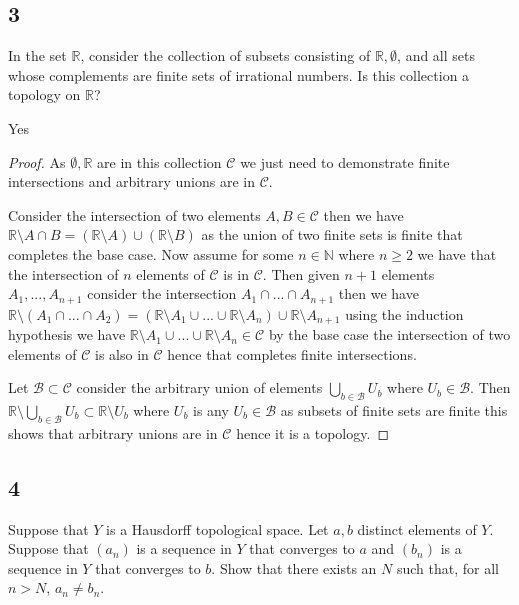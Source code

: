 \documentclass{amsart}
\theoremstyle{plain}
\theoremstyle{definition}
\theoremstyle{remark}
\begin{document}
\subsection*{3}
In the set $\mathbb{R}$, consider the collection of subsets consisting of $\mathbb{R},\emptyset$, and all sets whose complements are finite sets of irrational numbers. Is this collection a topology on $\mathbb{R}$?

Yes
\begin{proof}
   As $\emptyset ,\mathbb{R}$ are in this collection $\mathcal{C}$ we just need to demonstrate finite intersections  and arbitrary unions are in $\mathcal{C}$.

   Consider the intersection of two elements $A,B\in \mathcal{C}$ then we have $\mathbb{R}\setminus {A\cap B}=(\mathbb{R}\setminus A) \cup (\mathbb{R}\setminus B)$ as the union of two finite sets is finite that completes the base case. Now assume for some $n\in \mathbb{N}$ where $n\geq 2$ we have that the intersection of $n$ elements of $\mathcal C$ is in $\mathcal{C}$. Then given $n+1$ elements $A_1,...,A_{n+1}$ consider the intersection $A_1\cap ...\cap A_{n+1}$ then we have $\mathbb{R}\setminus (A_1\cap...\cap A_2) =(\mathbb{R}\setminus A_1\cup ...\cup \mathbb{R}\setminus A_n)\cup \mathbb{R}\setminus A_{n+1}$ using the induction hypothesis we have $\mathbb{R}\setminus A_1\cup...\cup\mathbb{R}\setminus A_n\in \mathcal{C}$ by the base case the intersection of two elements of $\mathcal{C}$ is also in $\mathcal{C}$ hence that completes finite intersections.

   Let $\mathcal{B}\subset \mathcal{C}$ consider the arbitrary union of elements $\bigcup_{b\in \mathcal{B}}U_b$ where $U_b\in \mathcal{B}$. Then $\mathbb{R}\setminus\bigcup_{b\in \mathcal{B}}U_{b}\subset \mathbb{R}\setminus U_b$ where $U_b$ is any $U_b\in \mathcal B$ as subsets of finite sets are finite this shows that arbitrary unions are in $\mathcal C$ hence it is a topology. 

\end{proof}

\subsection*{4}
Suppose that $Y$ is a Hausdorff topological space. Let $a,b$ distinct elements of $Y$. Suppose that $(a_n)$ is a sequence in $Y$ that converges to $a$ and $(b_n)$ is a sequence in $Y$ that converges to $b$. Show that there exists an $N$ such that, for all $n>N$, $a_n\not = b_n$.
\end{document}
